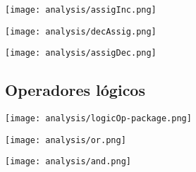 \begin{multicols}{2}
\begin{center}
\texttt{[image: analysis/assigInc.png]} 
\end{center}
\columnbreak
\begin{center}
\texttt{[image: analysis/decAssig.png]} 
\end{center}
\end{multicols}

\begin{center}
\texttt{[image: analysis/assigDec.png]} 
\end{center}

 \subsection {Operadores lógicos}
 \begin{center}
\texttt{[image: analysis/logicOp-package.png]} 
\end{center}

\begin{multicols}{2}
\begin{center}
\texttt{[image: analysis/or.png]} 
\end{center}
\columnbreak
\begin{center}
\texttt{[image: analysis/and.png]} 
\end{center}
\end{multicols}

